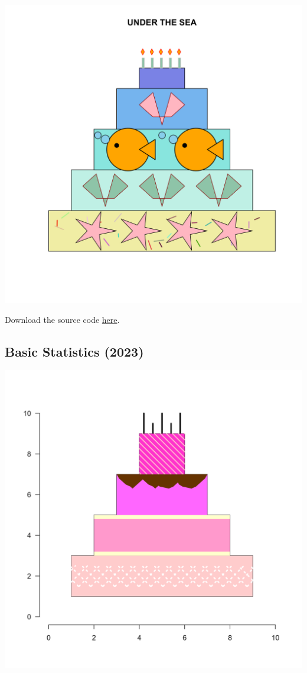 \documentclass[
]{book}
\begin{document}
\includegraphics[width=28in]{figures/R2024cake}

Download the source code \href{files/cake-winner-R-2024.qmd}{here}.

\hypertarget{basic-statistics-2023}{%
\subsection*{Basic Statistics (2023)}\label{basic-statistics-2023}}

\includegraphics[width=28in]{figures/BSM2023cake}
\end{document}
